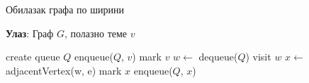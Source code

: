 \begin{algorithm}[H]
\caption{Обилазак графа по ширини}
\label{algorith:bfs-traversal-pseudo}
\hspace*{\algorithmicindent} \textbf{Улаз}: Граф $G$, полазно теме $v$
\begin{algorithmic}[1]
\State create queue $Q$
\State enqueue($Q$, $v$)
\State mark $v$
\State $w \gets$ dequeue($Q$)
\State visit $w$
\State $x \gets$ adjacentVertex(w, e)
\State mark $x$
\State enqueue($Q$, $x$)
\EndIf
\EndFor
\EndWhile
\EndProcedure
\end{algorithmic}
\end{algorithm}